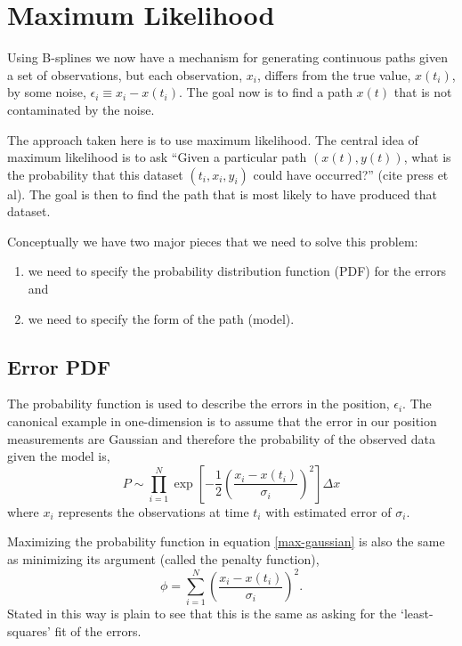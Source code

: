 \documentclass[twocol]{ametsoc}
\begin{document}
%
\section{Maximum Likelihood}
%

Using B-splines we now have a mechanism for generating continuous paths given a set of observations, but each observation, $x_i$, differs from the true value, $x(t_i)$, by some noise, $\epsilon_i \equiv x_i - x(t_i)$. The goal now is to find a path $x(t)$ that is not contaminated by the noise.

The approach taken here is to use maximum likelihood. The central idea of maximum likelihood is to ask ``Given a particular path $(x(t),y(t))$, what is the probability that this dataset $(t_i,x_i, y_i)$ could have occurred?'' (cite press et al). The goal is then to find the path that is most likely to have produced that dataset.

Conceptually we have two major pieces that we need to solve this problem:
\begin{enumerate}
\item we need to specify the probability distribution function (PDF) for the errors and
\item we need to specify the form of the path (model).
\end{enumerate}

\subsection{Error PDF}

The probability function is used to describe the errors in the position, $\epsilon_i$. The canonical example in one-dimension is to assume that the error in our position measurements are Gaussian and therefore the probability of the observed data given the model is,
\begin{equation}
\label{max-gaussian}
P \sim \prod_{i=1}^{N}  \exp \left[ -\frac{1}{2} \left( \frac{x_i - x(t_i)}{\sigma_i} \right)^2 \right] \Delta x
\end{equation}
where $x_i$ represents the observations at time $t_i$ with estimated error of $\sigma_i$.

Maximizing the probability function in equation \ref{max-gaussian} is also the same as minimizing its argument (called the penalty function),
\begin{equation}
\label{least-squares}
\phi =\sum_{i=1}^{N} \left( \frac{x_i - x(t_i)}{\sigma_i} \right)^2 .
\end{equation}
Stated in this way is plain to see that this is the same as asking for the `least-squares' fit of the errors.
\end{document}
